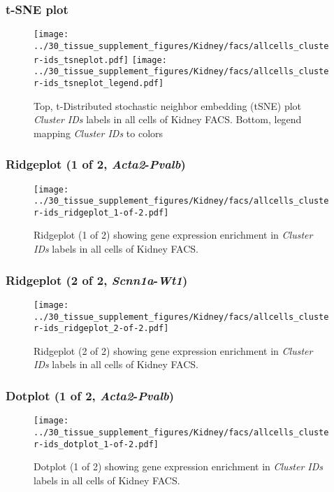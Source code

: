 \clearpage
\subsubsection{t-SNE plot}
\begin{figure}[h]
\centering
\texttt{[image: ../30\_tissue\_supplement\_figures/Kidney/facs/allcells\_cluster-ids\_tsneplot.pdf]}
\texttt{[image: ../30\_tissue\_supplement\_figures/Kidney/facs/allcells\_cluster-ids\_tsneplot\_legend.pdf]}
\caption{Top, t-Distributed stochastic neighbor embedding (tSNE) plot  \emph{Cluster IDs} labels in all cells of Kidney FACS. Bottom, legend mapping \emph{Cluster IDs} to colors}
\end{figure}


\clearpage

\subsubsection{Ridgeplot (1 of 2, \emph{Acta2}-\emph{Pvalb})}
\begin{figure}[h]
\centering
\texttt{[image: ../30\_tissue\_supplement\_figures/Kidney/facs/allcells\_cluster-ids\_ridgeplot\_1-of-2.pdf]}

\caption{ Ridgeplot (1 of 2)  showing gene expression enrichment in \emph{Cluster IDs} labels in all cells of Kidney FACS. }
\end{figure}


\clearpage

\subsubsection{Ridgeplot (2 of 2, \emph{Scnn1a}-\emph{Wt1})}
\begin{figure}[h]
\centering
\texttt{[image: ../30\_tissue\_supplement\_figures/Kidney/facs/allcells\_cluster-ids\_ridgeplot\_2-of-2.pdf]}

\caption{ Ridgeplot (2 of 2)  showing gene expression enrichment in \emph{Cluster IDs} labels in all cells of Kidney FACS. }
\end{figure}


\clearpage

\subsubsection{Dotplot (1 of 2, \emph{Acta2}-\emph{Pvalb})}
\begin{figure}[h]
\centering
\texttt{[image: ../30\_tissue\_supplement\_figures/Kidney/facs/allcells\_cluster-ids\_dotplot\_1-of-2.pdf]}

\caption{ Dotplot (1 of 2)  showing gene expression enrichment in \emph{Cluster IDs} labels in all cells of Kidney FACS. }
\end{figure}



